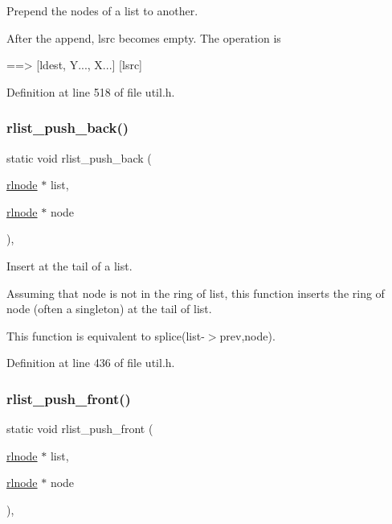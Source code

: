 Prepend the nodes of a list to another. 

After the append, {\ttfamily lsrc} becomes empty. The operation is \begin{DoxyVerb}[ldest, X...] [lsrc, Y...]  ==> [ldest, Y..., X...]  [lsrc]
\end{DoxyVerb}
 

Definition at line 518 of file util.\+h.

\mbox{\label{group__rlists_gac454004e8fb74ccd539e7fbd1affa86a}} 
\subsubsection{\texorpdfstring{rlist\+\_\+push\+\_\+back()}{rlist\_push\_back()}}
{\footnotesize\ttfamily static void rlist\+\_\+push\+\_\+back (\begin{DoxyParamCaption}\item[{\hyperlink{group__rlists_ga8f6244877f7ce2322c90525217ea6e7a}{rlnode} $\ast$}]{list,  }\item[{\hyperlink{group__rlists_ga8f6244877f7ce2322c90525217ea6e7a}{rlnode} $\ast$}]{node }\end{DoxyParamCaption})\hspace{0.3cm}{\ttfamily [inline]}, {\ttfamily [static]}}



Insert at the tail of a list. 

Assuming that {\ttfamily node} is not in the ring of {\ttfamily list}, this function inserts the ring of {\ttfamily node} (often a singleton) at the tail of {\ttfamily list}.

This function is equivalent to {\ttfamily splice}(list-\/$>$prev,node). 

Definition at line 436 of file util.\+h.

\mbox{\label{group__rlists_ga63ab59e50f2007a6bfedb0180a73b06f}} 
\subsubsection{\texorpdfstring{rlist\+\_\+push\+\_\+front()}{rlist\_push\_front()}}
{\footnotesize\ttfamily static void rlist\+\_\+push\+\_\+front (\begin{DoxyParamCaption}\item[{\hyperlink{group__rlists_ga8f6244877f7ce2322c90525217ea6e7a}{rlnode} $\ast$}]{list,  }\item[{\hyperlink{group__rlists_ga8f6244877f7ce2322c90525217ea6e7a}{rlnode} $\ast$}]{node }\end{DoxyParamCaption})\hspace{0.3cm}{\ttfamily [inline]}, {\ttfamily [static]}}



